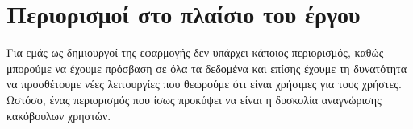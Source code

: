 \section{Περιορισμοί στο πλαίσιο του έργου}
Για εμάς ως δημιουργοί της εφαρμογής δεν υπάρχει κάποιος περιορισμός, καθώς μπορούμε να έχουμε πρόσβαση σε όλα τα δεδομένα και επίσης έχουμε τη δυνατότητα να προσθέτουμε νέες λειτουργίες που θεωρούμε ότι είναι χρήσιμες για τους χρήστες. Ωστόσο, ένας περιορισμός που ίσως προκύψει να είναι η δυσκολία αναγνώρισης κακόβουλων χρηστών.
